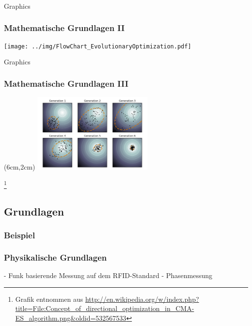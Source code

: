 \begin{frame}{Graphics} 
  	\frametitle{Mathematische Grundlagen II}
	\texttt{[image: ../img/FlowChart\_EvolutionaryOptimization.pdf]}
\end{frame}
\begin{frame}{Graphics} 
  	\frametitle{Mathematische Grundlagen III}
%  	
  	\begin{textblock*}{6cm}(6cm,2cm) %
  		\includegraphics[width=6cm]{../img/Concept_of_directional_optimization_in_CMA-ES_algorithm.png}
  	\end{textblock*}
%  	
  	\footnote{Grafik entnommen aus \url{http://en.wikipedia.org/w/index.php?title=File:Concept_of_directional_optimization_in_CMA-ES_algorithm.png&oldid=532567533}}
%  	
\end{frame}
\subsection{Grundlagen}
\begin{frame} %
  \frametitle{Beispiel}
\end{frame}
\begin{frame}
  \frametitle{Physikalische Grundlagen}
	- Funk basierende Messung auf dem RFID-Standard 
	- Phasenmessung
\end{frame}
